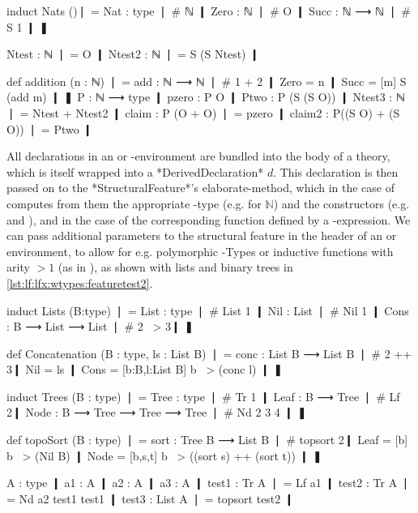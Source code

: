 \begin{mmtcode}[caption={\wtypesym-Types with Structural Features\protect\footnotemark},label=lst:lf:lfx:wtypes:featuretest]
induct Nats ()❘ =
  Nat : type ❘ # ℕ ❙
  Zero : ℕ ❘ # O ❙
  Succ : ℕ ⟶ ℕ ❘ # S 1 ❙
❚
	
Ntest : ℕ ❘ = O ❙
Ntest2 : ℕ ❘ = S (S Ntest) ❙ 
	
def addition (n : ℕ) ❘ =
  add : ℕ ⟶ ℕ ❘ # 1 + 2 ❙
  Zero = n ❙
  Succ = [m] S (add m) ❙
❚
P : ℕ ⟶ type ❙
pzero : P O ❙
Ptwo : P (S (S O)) ❙
Ntest3 : ℕ ❘ = Ntest + Ntest2 ❙
claim : P (O + O) ❘ = pzero ❙
claim2 : P((S O) + (S O)) ❘ = Ptwo ❙
\end{mmtcode}

All declarations in an  or -environment are bundled into the body of a theory, which is itself wrapped into a *DerivedDeclaration* $d$. This declaration is then passed on to the *StructuralFeature*'s elaborate-method, which in the case of  computes from them the appropriate \wtypesym-type (e.g. for $\mathbb N$) and the constructors (e.g.  and ), and in the case of  the corresponding function defined by a \wrecsym-expression. We can pass additional parameters to the structural feature in the header of an  or  environment, to allow for e.g. polymorphic \wtypesym-Types or inductive functions with arity $>1$ (as in ), as shown with lists and binary trees in \autoref{lst:lf:lfx:wtypes:featuretest2}.

\begin{mmtcode}[caption={Lists and Trees \protect\footnotemark},label=lst:lf:lfx:wtypes:featuretest2]
induct Lists (B:type) ❘ =
  List : type ❘ # List 1 ❙
  Nil : List ❘ # Nil 1 ❙
  Cons : B ⟶ List ⟶ List ❘ # 2 ~> 3❙
❚
	
def Concatenation (B : type, ls : List B) ❘ =
  conc : List B ⟶ List B ❘ # 2 ++ 3❙
  Nil = ls ❙
  Cons = [b:B,l:List B] b ~> (conc l) ❙
❚
	
induct Trees (B : type) ❘ =
  Tree : type ❘ # Tr 1 ❙
  Leaf : B ⟶ Tree ❘ # Lf 2❙
  Node : B ⟶ Tree ⟶ Tree ⟶ Tree ❘ # Nd 2 3 4 ❙
❚
	
def topoSort (B : type) ❘ =
  sort : Tree B ⟶ List B ❘ # topsort 2❙
  Leaf = [b] b ~> (Nil B) ❙
  Node = [b,s,t] b ~> ((sort s) ++ (sort t)) ❙
❚
	
A : type ❙
a1 : A ❙
a2 : A ❙
a3 : A ❙
test1 : Tr A ❘ = Lf a1 ❙
test2 : Tr A ❘ = Nd a2 test1 test1 ❙
test3 : List A ❘ = topsort test2 ❙
\end{mmtcode}

